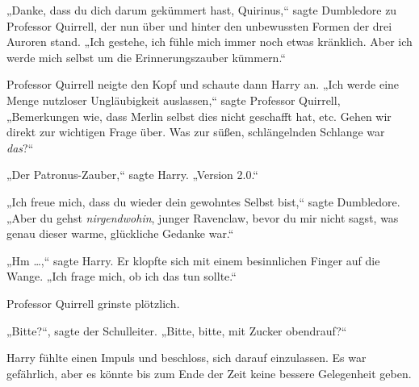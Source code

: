 „Danke, dass du dich darum gekümmert hast, Quirinus,“ sagte Dumbledore zu Professor Quirrell, der nun über und hinter den unbewussten Formen der drei Auroren stand. „Ich gestehe, ich fühle mich immer noch etwas kränklich. Aber ich werde mich selbst um die Erinnerungszauber kümmern.“

Professor Quirrell neigte den Kopf und schaute dann Harry an. „Ich werde eine Menge nutzloser Ungläubigkeit auslassen,“ sagte Professor Quirrell, „Bemerkungen wie, dass Merlin selbst dies nicht geschafft hat, etc. Gehen wir direkt zur wichtigen Frage über. Was zur süßen, schlängelnden Schlange war \emph{das}?“

„Der Patronus-Zauber,“ sagte Harry. „Version 2.0.“

„Ich freue mich, dass du wieder dein gewohntes Selbst bist,“ sagte Dumbledore. „Aber du gehst \emph{nirgendwohin}, junger Ravenclaw, bevor du mir nicht sagst, was genau dieser warme, glückliche Gedanke war.“

„Hm …,“ sagte Harry. Er klopfte sich mit einem besinnlichen Finger auf die Wange. „Ich frage mich, ob ich das tun sollte.“

Professor Quirrell grinste plötzlich.

„Bitte?“, sagte der Schulleiter. „Bitte, bitte, mit Zucker obendrauf?“

Harry fühlte einen Impuls und beschloss, sich darauf einzulassen. Es war gefährlich, aber es könnte bis zum Ende der Zeit keine bessere Gelegenheit geben.

